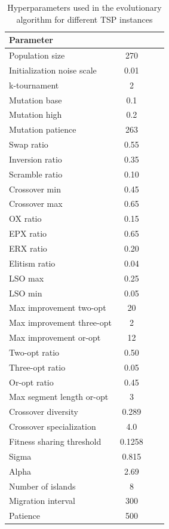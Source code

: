 \documentclass[a4paper,10pt]{article} %
\begin{document}
\begin{table}[h!]
\centering
\begin{tabular}{lccc}
\hline
\textbf{Parameter} &  &  &  \\
\hline
Population size & 270 & & \\
Initialization noise scale & 0.01 & & \\
k-tournament & 2 & & \\
Mutation base & 0.1 & & \\
Mutation high & 0.2 & & \\
Mutation patience & 263 & & \\
Swap ratio & 0.55 & & \\
Inversion ratio & 0.35 & & \\
Scramble ratio & 0.10 & & \\
Crossover min & 0.45 & & \\
Crossover max & 0.65 & & \\
OX ratio & 0.15 & & \\
EPX ratio & 0.65 & & \\
ERX ratio & 0.20 & & \\
Elitism ratio & 0.04 & & \\
LSO max & 0.25 & & \\
LSO min & 0.05 & & \\
Max improvement two-opt & 20 & & \\
Max improvement three-opt & 2 & & \\
Max improvement or-opt & 12 & & \\
Two-opt ratio & 0.50 & & \\
Three-opt ratio & 0.05 & & \\
Or-opt ratio & 0.45 & & \\
Max segment length or-opt & 3 & & \\
Crossover diversity & 0.289 & & \\
Crossover specialization & 4.0 & & \\
Fitness sharing threshold & 0.1258 & & \\
Sigma & 0.815 & & \\
Alpha & 2.69 & & \\
Number of islands & 8 & & \\
Migration interval & 300 & & \\
Patience & 500 & & \\
\hline
\end{tabular}
\caption{Hyperparameters used in the evolutionary algorithm for different TSP instances}
\label{tab_hyperparams}
\end{table}
\end{document}

